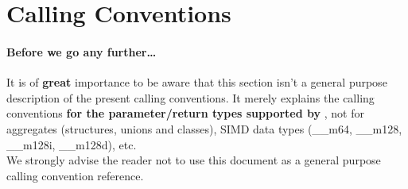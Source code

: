 %
%
%
%

\newpage


\section{Calling Conventions}

\paragraph{Before we go any further\ldots}

It is of {\bf great} importance to be aware that this section isn't a general
purpose description of the present calling conventions.
It merely explains the calling conventions {\bf for the parameter/return types
supported by \dc}, not for aggregates (structures, unions and classes), SIMD
data types (\_\_m64, \_\_m128, \_\_m128i, \_\_m128d), etc.\\
We strongly advise the reader not to use this document as a general purpose
calling convention reference.

\newpage
\newpage
\newpage
\newpage


